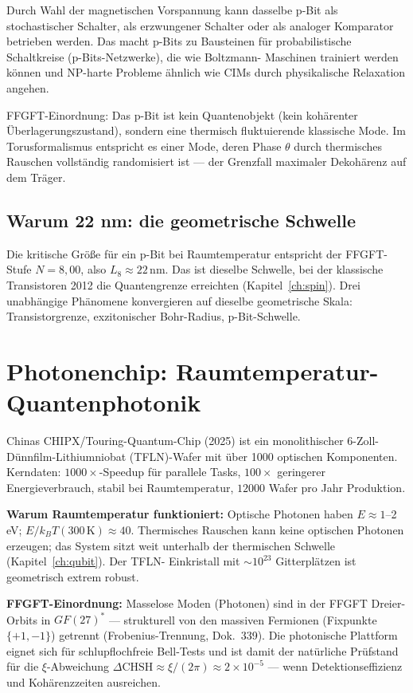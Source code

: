 Durch Wahl der magnetischen Vorspannung kann dasselbe p-Bit als
stochastischer Schalter, als erzwungener Schalter oder als analoger
Komparator betrieben werden. Das macht p-Bits zu Bausteinen für
probabilistische Schaltkreise (p-Bits-Netzwerke), die wie Boltzmann-
Maschinen trainiert werden können und NP-harte Probleme ähnlich wie CIMs
durch physikalische Relaxation angehen.

FFGFT-Einordnung: Das p-Bit ist kein Quantenobjekt (kein kohärenter
Überlagerungszustand), sondern eine thermisch fluktuierende klassische
Mode. Im Torusformalismus entspricht es einer Mode, deren Phase $\theta$
durch thermisches Rauschen vollständig randomisiert ist --- der Grenzfall
maximaler Dekohärenz auf dem Träger.

\subsection*{Warum 22 nm: die geometrische Schwelle}

Die kritische Größe für ein p-Bit bei Raumtemperatur entspricht der
FFGFT-Stufe $N = 8{,}00$, also $L_8\approx22$\,nm. Das ist dieselbe
Schwelle, bei der klassische Transistoren 2012 die Quantengrenze
erreichten (Kapitel~\ref{ch:spin}). Drei unabhängige Phänomene konvergieren
auf dieselbe geometrische Skala: Transistorgrenze, exzitonischer
Bohr-Radius, p-Bit-Schwelle.

\section{Photonenchip: Raumtemperatur-Quantenphotonik}

Chinas CHIPX/Touring-Quantum-Chip (2025) ist ein monolithischer
6-Zoll-Dünnfilm-Lithiumniobat (TFLN)-Wafer mit über 1000 optischen
Komponenten. Kerndaten: $1000\times$-Speedup für parallele Tasks,
$100\times$ geringerer Energieverbrauch, stabil bei Raumtemperatur,
$12000$ Wafer pro Jahr Produktion.

\textbf{Warum Raumtemperatur funktioniert:} Optische Photonen haben
$E\approx1$--2\,eV; $E/k_BT(300\,\text{K})\approx40$. Thermisches
Rauschen kann keine optischen Photonen erzeugen; das System sitzt weit
unterhalb der thermischen Schwelle (Kapitel~\ref{ch:qubit}). Der TFLN-
Einkristall mit $\sim10^{23}$ Gitterplätzen ist geometrisch extrem
robust.

\textbf{FFGFT-Einordnung:} Masselose Moden (Photonen) sind in der FFGFT
Dreier-Orbits in $GF(27)^*$ --- strukturell von den massiven Fermionen
(Fixpunkte $\{+1,-1\}$) getrennt (Frobenius-Trennung, Dok.~339).
Die photonische Plattform eignet sich für schlupflochfreie Bell-Tests und
ist damit der natürliche Prüfstand für die $\xi$-Abweichung
$\Delta\mathrm{CHSH}\approx\xi/(2\pi)\approx2\times10^{-5}$ --- wenn
Detektionseffizienz und Kohärenzzeiten ausreichen.


